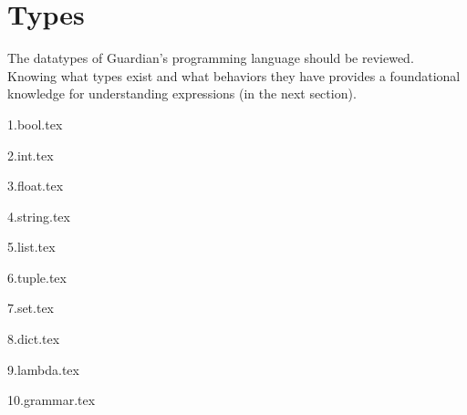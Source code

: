 
\section{Types}
{
	The datatypes of Guardian's programming language
	should be reviewed.
	Knowing what types exist
	and what behaviors they have
	provides
	a foundational knowledge for
	understanding expressions (in the next section).
	
	{1.bool.tex}
	
	{2.int.tex}
	
	{3.float.tex}
	
	{4.string.tex}
	
	{5.list.tex}
	
	{6.tuple.tex}
	
	{7.set.tex}
	
	{8.dict.tex}
	
	{9.lambda.tex}
	
	{10.grammar.tex}
}

